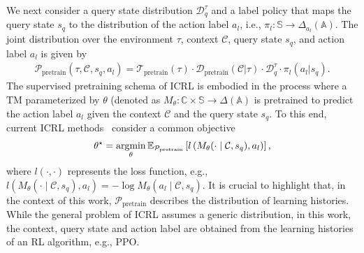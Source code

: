 \documentclass{article}
\newcommand{\argmin}{\operatornamewithlimits{argmin}}
\def\mbA{{\ensuremath{\mathbb A}}}
\def\mbC{{\ensuremath{\mathbb C}}}
\def\mbE{{\ensuremath{\mathbb E}}}
\def\mbS{{\ensuremath{\mathbb S}}}
\def\ccalC{{\ensuremath{\mathcal C}}}
\def\ccalD{{\ensuremath{\mathcal D}}}
\def\ccalP{{\ensuremath{\mathcal P}}}
\def\ccalT{{\ensuremath{\mathcal T}}}
\begin{document}
We next consider a query state distribution $\ccalD_q^\tau$ and a label policy that maps the query state $s_q$ to the distribution of the action label $a_l$, i.e., $\pi_{l}: \mbS \to \Delta_{a_l} (\mbA)$.
The joint distribution over the environment $\tau$, context $\ccalC$, query state $s_{q}$, and action label $a_{l}$ is given by
\begin{align}\label{eqn_pretrain_distribution}
    \ccalP_{\text{pretrain}} (\tau, \ccalC, s_{q}, a_{l}) = \ccalT_{\text{pretrain}} (\tau) \cdot \ccalD_{\text{pretrain}} (\ccalC | \tau) \cdot \ccalD_q^\tau \cdot \pi_{l}(a_{l} | s_{q}).
\end{align}
The supervised pretraining schema of ICRL is embodied in the process where a TM parameterized by $\theta$ (denoted as $M_\theta: \mbC \times \mbS \to \Delta(\mbA)$ is pretrained to predict the action label $a_l$ given the context $\ccalC$ and the query state $s_q$. To this end, current ICRL methods~\citep{laskin2022context, lee2024supervised, chen2025random, son2025distilling} consider a common objective
\begin{align}\label{eqn_icrl_obj_unweighted}
    \theta^\star = \argmin_\theta \mbE_{\ccalP_{\text{pretrain}}} \left[ l \left( M_\theta(\cdot \mid \ccalC, s_{q}), a_{l}\right) \right],
\end{align}
where $l(\cdot, \cdot)$ represents the loss function, e.g., $l \left( M_\theta(\cdot \mid \ccalC, s_{q}), a_{l}\right) = -
\log M_\theta(a_l \mid \ccalC, s_{q})$.
It is crucial to highlight that, in the context of this work, $\ccalP_{\text{pretrain}}$ describes the distribution of learning histories. While the general problem of ICRL assumes a generic distribution, in this work, the context, query state and action label are obtained from the learning histories of an RL algorithm, e.g., PPO.
\end{document}

